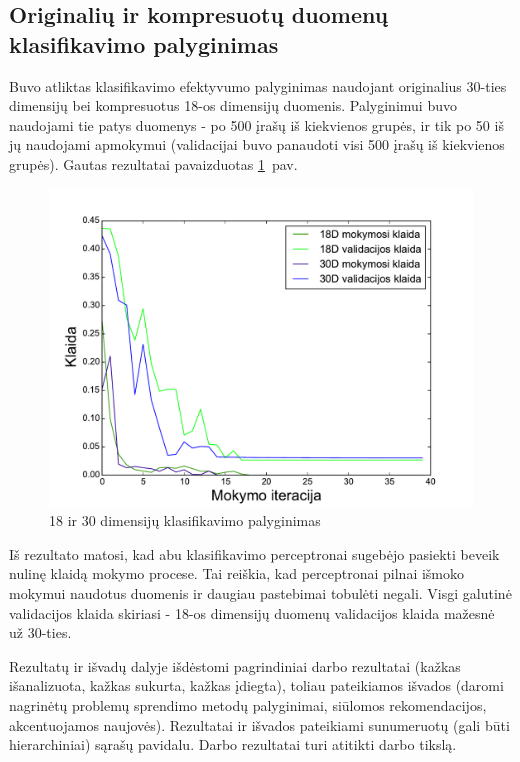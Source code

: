 \documentclass{VUMIFPSbakalaurinis}
\begin{document}
\subsection{Originalių ir kompresuotų duomenų klasifikavimo palyginimas}

Buvo atliktas klasifikavimo efektyvumo palyginimas naudojant originalius 30-ties dimensijų bei kompresuotus 18-os dimensijų duomenis.
Palyginimui buvo naudojami tie patys duomenys - po 500 įrašų iš kiekvienos grupės, ir tik po 50 iš jų naudojami apmokymui (validacijai buvo panaudoti visi 500 įrašų iš kiekvienos grupės).
Gautas rezultatai pavaizduotas \ref{fig:dim-comparisons}~pav.

\begin{figure}
	\includegraphics[scale=0.75]{pics/dim_comparisons_2015-5-27_14-21-13}
	\caption{18 ir 30 dimensijų klasifikavimo palyginimas}
	\label{fig:dim-comparisons}
\end{figure}

Iš rezultato matosi, kad abu klasifikavimo perceptronai sugebėjo pasiekti beveik nulinę klaidą mokymo procese.
Tai reiškia, kad perceptronai pilnai išmoko mokymui naudotus duomenis ir daugiau pastebimai tobulėti negali.
Visgi galutinė validacijos klaida skiriasi - 18-os dimensijų duomenų validacijos klaida mažesnė už 30-ties.


Rezultatų ir išvadų dalyje išdėstomi pagrindiniai darbo rezultatai (kažkas
išanalizuota, kažkas sukurta, kažkas įdiegta), toliau pateikiamos išvados
(daromi nagrinėtų problemų sprendimo metodų palyginimai, siūlomos
rekomendacijos, akcentuojamos naujovės). Rezultatai ir išvados pateikiami
sunumeruotų (gali būti hierarchiniai) sąrašų pavidalu. Darbo rezultatai turi
atitikti darbo tikslą.
\end{document}
